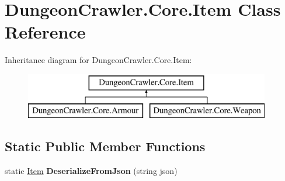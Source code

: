 \hypertarget{class_dungeon_crawler_1_1_core_1_1_item}{}\section{Dungeon\+Crawler.\+Core.\+Item Class Reference}
\label{class_dungeon_crawler_1_1_core_1_1_item}
Inheritance diagram for Dungeon\+Crawler.\+Core.\+Item\+:\begin{figure}[H]
\begin{center}
\leavevmode
\includegraphics[height=2.000000cm]{class_dungeon_crawler_1_1_core_1_1_item}
\end{center}
\end{figure}
\subsection*{Static Public Member Functions}
\begin{DoxyCompactItemize}
\item 
\hypertarget{class_dungeon_crawler_1_1_core_1_1_item_a22c805fd74054dc453cc8710b7b0a023}{}static \hyperlink{class_dungeon_crawler_1_1_core_1_1_item}{Item} {\bfseries Deserialize\+From\+Json} (string json)\label{class_dungeon_crawler_1_1_core_1_1_item_a22c805fd74054dc453cc8710b7b0a023}

\end{DoxyCompactItemize}
